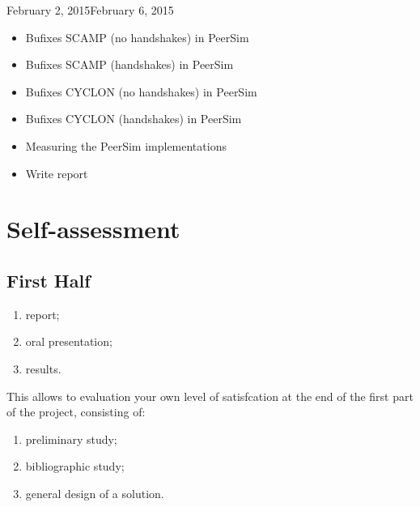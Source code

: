 \documentclass[11pt, english, screen]{report-rd-info}
\begin{document}
\begin{fichesuivi}{February 2, 2015}{February 6, 2015}

   \begin{travaileffectue}
   \begin{itemize}
   \item {Bufixes SCAMP (no handshakes) in PeerSim}
   \item {Bufixes SCAMP (handshakes) in PeerSim}
   \item {Bufixes CYCLON (no handshakes) in PeerSim}
   \item {Bufixes CYCLON (handshakes) in PeerSim}
   \item {Measuring the PeerSim implementations}
   \item {Write report}
      \end{itemize}
   \end{travaileffectue}

   \begin{travailnoneffectue}
   \end{travailnoneffectue}

   \begin{echange}
   \end{echange}

   \begin{planification}
   \end{planification}
\end{fichesuivi}


\printweeksummary

\chapter{Self-assessment}

\section{First Half}

\begin{enumerate}
   \item report;
   \item oral presentation;
   \item results.
\end{enumerate}
This allows to evaluation your own level of satisfcation at the end of the first part of the project, consisting of:
\begin{enumerate}
   \item preliminary study;
   \item bibliographic study;
   \item general design of a solution.
\end{enumerate}
\end{document}
